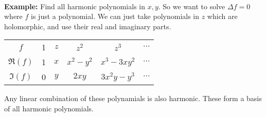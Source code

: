 \documentclass{article}
\begin{document}
\noindent \\ \textbf{Example:} Find all harmonic polynomials in $x,y$. So we want to solve $\Delta f = 0$
where $f$ is just a polynomial. We can just take polynomials in $z$ which are holomorphic, and use
their real and imaginary parts.
\begin{center}
	\begin{tabular}{c | c c c c c}
		$f$      & 1 & $z$ & $z^2$     & $z^3$       & $\cdots$ \\
		$\Re(f)$ & 1 & $x$ & $x^2-y^2$ & $x^3-3xy^2$ & $\cdots$ \\
		$\Im(f)$ & 0 & $y$ & $2xy$     & $3x^2y-y^3$ & $\cdots$ \\
	\end{tabular}
\end{center}
Any linear combination of these polynamials is also harmonic. These form a basis of all harmonic
polynomials.
\end{document}
